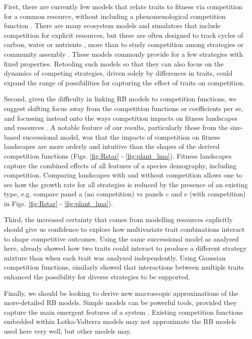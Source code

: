 \documentclass[a4paper,11pt]{article}
\begin{document}
First, there are currently few models that relate traits to fitness via competition for a common resource, without including a phenomenological competition function \citep{DAndrea-2016a}. There are many ecosystem models and simulators that include competition for explicit resources, but these are often designed to track cycles of carbon, water or nutrients \citep{Moorcroft-2001, Medvigy-2012, Smith-2014,Fisher-2018}, more than to study competition among strategies or community assembly \citep{Kohyama-1993, Falster-2017}. These models commonly provide for a few strategies with fixed properties. Retooling such models so that they can also focus on the dynamics of competing strategies, driven solely by differences in traits, could expand the range of possibilities for capturing the effect of traits on competition.

Second, given the difficulty in linking RB models to competition functions, we suggest shifting focus away from the competition functions or coefficients per se, and focussing instead onto the ways competition impacts on fitness landscapes and resources \citep[see also][]{Laughlin-2020}. A notable feature of our results, particularly those from the size-based successional model, was that the impacts of competition on fitness landscapes are more orderly and intuitive than the shapes of the derived competition functions (Figs. \ref{fig:Rstar} - \ref{fig:plant_lma}). Fitness landscapes capture the combined effects of all features of a species demography, including competition. Comparing landscapes with and without competition allows one to see how the growth rate for all strategies is reduced by the presence of an existing type, e.g. compare panel a (no competition) vs panels c and e (with competition) in Figs. \ref{fig:Rstar} - \ref{fig:plant_lma}). 

Third, the increased certainty that comes from modelling resources explicitly should give us confidence to explore how multivariate trait combinations interact to shape competitive outcomes. Using the same successional model as analysed here, \citet{Falster-2017} already showed how two traits could interact to produce a different strategy mixture than when each trait was analysed independently. Using Gaussian competition functions, \citet{Doebeli-2010} similarly showed that interactions between multiple traits enhanced the possibility for diverse strategies to be supported. 

Finally, we should be looking to derive new macroscopic approximations of the more-detailed RB models. Simple models can be powerful tools, provided they capture the main emergent features of a system \citep{Levin-2006}. Existing competition functions embedded within Lotka-Volterra models may not approximate the RB models used here very well, but other models may.
\end{document}
